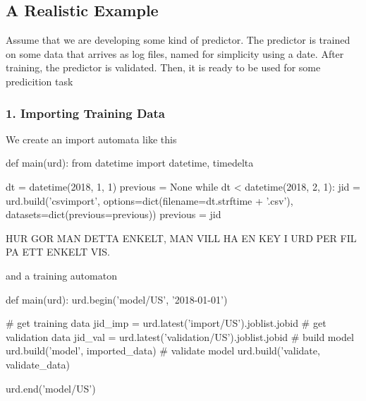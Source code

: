 \documentclass[a4paper]{article}
\begin{document}
\subsection{A Realistic Example}
Assume that we are developing some kind of predictor.  The predictor
is trained on some data that arrives as log files, named for
simplicity using a date.  After training, the predictor is validated.  Then, it is ready to be used for some predicition task

\subsubsection*{1.  Importing Training Data}
We create an import automata like this
\begin{python}
def main(urd):
  from datetime import datetime, timedelta

  dt = datetime(2018, 1, 1)
  previous = None
  while dt < datetime(2018, 2, 1):
    jid = urd.build('csvimport', options=dict(filename=dt.strftime + '.csv'), datasets=dict(previous=previous))
    previous = jid
\end{python}
HUR GOR MAN DETTA ENKELT, MAN VILL HA EN KEY I URD PER FIL PA ETT ENKELT VIS.



and a  training automaton
\begin{python}
def main(urd):
  urd.begin('model/US', '2018-01-01')

  # get training data
  jid_imp = urd.latest('import/US').joblist.jobid
  # get validation data
  jid_val = urd.latest('validation/US').joblist.jobid
  # build model
  urd.build('model', imported_data)
  # validate model
  urd.build('validate, validate_data)

  urd.end('model/US')
\end{python}


\begin{python}
\end{python}
\end{document}
